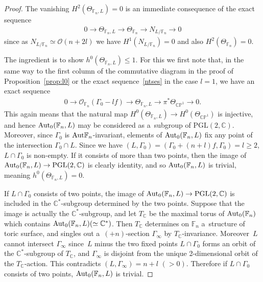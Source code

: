 \documentclass[pdftex]{sigma}
\numberwithin{equation}{section}
\begin{document}
\begin{proof}
The vanishing $H^2 (\Theta_{\mathbb{F}_n, L}) =0$ is an immediate consequence of the exact sequence
\begin{gather}
\label{ses:56}
0
\longrightarrow
\Theta_{\mathbb{F}_n,L}
\longrightarrow
\Theta_{\mathbb{F}_n}
\longrightarrow
N_{L/\mathbb{F}_n}
\longrightarrow
0
\end{gather}
since as $N_{L/\mathbb{F}_n}\simeq\mathscr O(n+2l)$ we have $H^1(N_{L/\mathbb{F}_n}) = 0$ and also
$H^2(\Theta_{\mathbb{F}_n}) =0$.

{\sloppy The ingredient is to show $h^0(\Theta_{\mathbb{F}_n, L}) \le 1$.
For this we f\/irst note that, in the same way to the f\/irst column of the commutative diagram in the proof of
Proposition~\ref{prop:l0} or the exact sequence~\eqref{ntses} in the case $l=1$, we have an exact sequence
\begin{gather*}%
0
\longrightarrow
\mathscr O_{\mathbb{F}_n} (\Gamma_0 - lf )
\longrightarrow
\Theta_{\mathbb{F}_n,L}
\longrightarrow
\pi^*\Theta_{\mathbb{CP}^1}
\longrightarrow
0.
\end{gather*}
This again means that the natural map $H^0(\Theta_{\mathbb{F}_n,L} ) \to H^0(\Theta_{\mathbb{CP}^1})$ is injective, and
hence ${\rm{Aut}}_0(\mathbb{F}_n,L)$ may be considered as a~subgroup of $\mathrm{PGL}(2,\mathbb{C})$.
Moreover, since $\Gamma_0$ is ${\rm{Aut}}\mathbb{F}_n$-invariant, ele\-ments of ${\rm{Aut}}_0(\mathbb{F}_n,L)$ f\/ix any
point of the intersection $\Gamma_0\cap L$.
Since we have $(L,\Gamma_0)=(\Gamma_0 + (n+l)f,\Gamma_0) = l\ge 2$, $L\cap \Gamma_0$ is non-empty.
If it consists of more than two points, then the image of ${\rm{Aut}}_0(\mathbb{F}_n,L)\to \mathrm{PGL}(2,\mathbb{C})$
is clearly identity, and so ${\rm{Aut}}_0(\mathbb{F}_n,L)$ is trivial, meaning $h^0(\Theta_{\mathbb{F}_n,L})=0$.

}

If $L\cap \Gamma_0$ consists of two points, the image of ${\rm{Aut}}_0(\mathbb{F}_n,L)\to \mathrm{PGL}(2,\mathbb{C})$ is
included in the $\mathbb{C}^*$-subgroup determined by the two points.
Suppose that the image is actually the $\mathbb{C}^*$-subgroup, and let $T_{\mathbb{C}}$ be the maximal torus of
${\rm{Aut}}_0(\mathbb{F}_n)$ which contains ${\rm{Aut}}_0(\mathbb{F}_n,L)(\simeq \mathbb{C}^*)$.
Then $T_{\mathbb{C}}$ determines on $\mathbb{F}_n$ a~structure of toric surface, and singles out a~$(+n)$-section
$\Gamma_{\infty}$ by $T_{\mathbb{C}}$-invariance.
Moreover~$L$ cannot intersect $\Gamma_{\infty}$ since~$L$ minus the two f\/ixed points $L\cap\Gamma_0$ forms an orbit of
the $\mathbb{C}^*$-subgroup of $T_{\mathbb{C}}$, and $\Gamma_{\infty}$ is disjoint from the unique 2-dimensional orbit
of the $T_{\mathbb{C}}$-action.
This contradicts $(L,\Gamma_{\infty})=n+l$ $(>0)$.
Therefore if $L\cap \Gamma_0$ consists of two points, ${\rm{Aut}}_0(\mathbb{F}_n,L)$ is trivial.


\end{proof}
\end{document}
